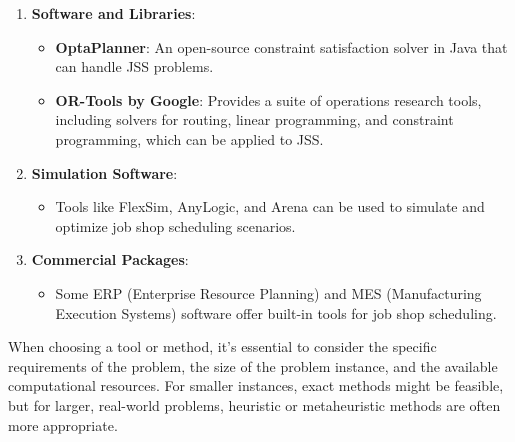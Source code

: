 \begin{enumerate}
    \item \textbf{Software and Libraries}:
    \begin{itemize}
        \item \textbf{OptaPlanner}: An open-source constraint satisfaction solver in Java that can handle JSS problems.
        \item \textbf{OR-Tools by Google}: Provides a suite of operations research tools, including solvers for routing, linear programming, and constraint programming, which can be applied to JSS.
    \end{itemize}

    \item \textbf{Simulation Software}:
    \begin{itemize}
        \item Tools like FlexSim, AnyLogic, and Arena can be used to simulate and optimize job shop scheduling scenarios.
    \end{itemize}

    \item \textbf{Commercial Packages}:
    \begin{itemize}
        \item Some ERP (Enterprise Resource Planning) and MES (Manufacturing Execution Systems) software offer built-in tools for job shop scheduling.
    \end{itemize}
\end{enumerate}

When choosing a tool or method, it's essential to consider the specific requirements of the problem, the size of the problem instance, and the available computational resources. For smaller instances, exact methods might be feasible, but for larger, real-world problems, heuristic or metaheuristic methods are often more appropriate.






%
